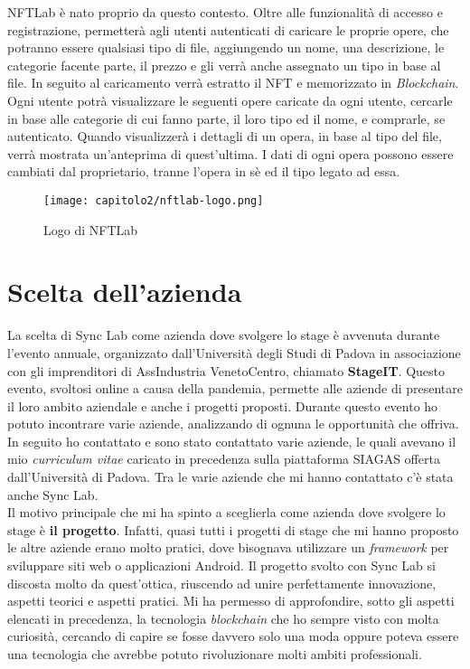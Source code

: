 NFTLab è nato proprio da questo contesto. Oltre alle funzionalità di accesso e registrazione, permetterà agli utenti autenticati di caricare le proprie opere, che potranno essere qualsiasi tipo di file, aggiungendo un nome, una descrizione, le categorie facente parte, il prezzo e gli verrà anche assegnato un tipo in base al file. In seguito al caricamento verrà estratto il NFT e memorizzato in \emph{Blockchain}. 
Ogni utente potrà visualizzare le seguenti opere caricate da ogni utente, cercarle in base alle categorie di cui fanno parte, il loro tipo ed il nome, e comprarle, se autenticato. Quando visualizzerà i dettagli di un opera, in base al tipo del file, verrà mostrata un'anteprima di quest'ultima.
I dati di ogni opera possono essere cambiati dal proprietario, tranne l'opera in sè ed il tipo legato ad essa.

\begin{figure}[!h]
  \centering
  \texttt{[image: capitolo2/nftlab-logo.png]}
  \caption{Logo di NFTLab}
\end{figure}


\section{Scelta dell'azienda}
La scelta di Sync Lab come azienda dove svolgere lo stage è avvenuta durante l'evento annuale, organizzato dall'Università degli Studi di Padova in associazione con gli imprenditori di AssIndustria VenetoCentro, chiamato \textbf{StageIT}. Questo evento, svoltosi online a causa della pandemia, permette alle aziende di presentare il loro ambito aziendale e anche i progetti proposti. Durante questo evento ho potuto incontrare varie aziende, analizzando di ognuna le opportunità che offriva. In seguito ho contattato e sono stato contattato varie aziende, le quali avevano il mio \textit{curriculum vitae} caricato in precedenza sulla piattaforma SIAGAS offerta dall'Università di Padova. Tra le varie aziende che mi hanno contattato c'è stata anche Sync Lab. \\

Il motivo principale che mi ha spinto a sceglierla come azienda dove svolgere lo stage è \textbf{il progetto}. Infatti, quasi tutti i progetti di stage che mi hanno proposto le altre aziende erano molto pratici, dove bisognava utilizzare un \textit{framework} per sviluppare siti web o applicazioni Android. Il progetto svolto con Sync Lab si discosta molto da quest'ottica, riuscendo ad unire perfettamente innovazione, aspetti teorici e aspetti pratici. Mi ha permesso di approfondire, sotto gli aspetti elencati in precedenza, la tecnologia \textit{blockchain} che ho sempre visto con molta curiosità, cercando di capire se fosse davvero solo una moda oppure poteva essere una tecnologia che avrebbe potuto rivoluzionare molti ambiti professionali. \\

